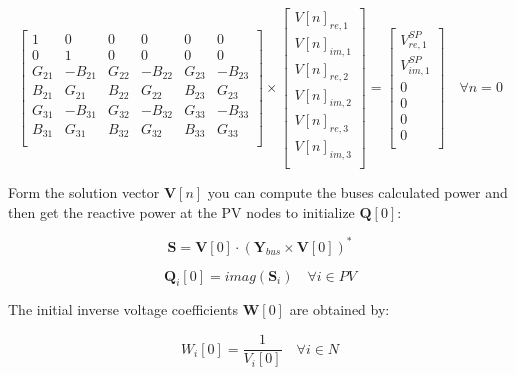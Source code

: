\documentclass[11pt,fleqn]{book} %
\begin{document}
\begin{equation}
\begin{bmatrix}
1 & 0 & 0 & 0 & 0 & 0\\
0 & 1 & 0 & 0 & 0 & 0\\
G_{21} & -B_{21} & G_{22} & -B_{22} & G_{23} & -B_{23}\\
B_{21} & G_{21}  & B_{22} & G_{22}  & B_{23} & G_{23}\\
G_{31} & -B_{31} & G_{32} & -B_{32} & G_{33} & -B_{33}\\
B_{31} & G_{31}  & B_{32} & G_{32}  & B_{33} & G_{33}\\
\end{bmatrix}
\times
\begin{bmatrix}
V[n]_{re, 1}\\
V[n]_{im, 1}\\
V[n]_{re, 2}\\
V[n]_{im, 2}\\
V[n]_{re, 3}\\
V[n]_{im, 3}\\
\end{bmatrix}
=
\begin{bmatrix}
V^{SP}_{re, 1}\\
V^{SP}_{im, 1}\\
0\\
0\\
0\\
0\\
\end{bmatrix}
\quad \forall n = 0
\end{equation}

Form the solution vector $\textbf{V}[n]$ you can compute the buses calculated power and then get the reactive power at the PV nodes to initialize $\textbf{Q}[0]$:

\begin{equation}
\textbf{S} = \textbf{V}[0] \cdot (\textbf{Y}_{bus} \times \textbf{V}[0])^*
\label{Scalc}
\end{equation}

\begin{equation}
\textbf{Q}_i[0] = imag(\textbf{S}_{i}) \quad \forall i \in PV
\end{equation}

The initial inverse voltage coefficients $\textbf{W}[0]$ are obtained by:

\begin{equation}
W_i[0] = \frac{1}{V_i[0]}  \quad \forall i \in N
\end{equation}
\end{document}
